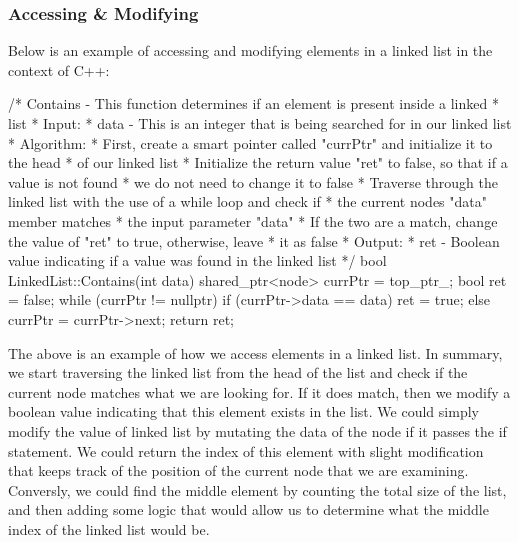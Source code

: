 \begin{highlight}

\subsubsection*{Accessing \& Modifying}

Below is an example of accessing and modifying elements in a linked list in the context of C++:

\begin{code}
/*  Contains - This function determines if an element is present inside a linked
*   list
*   Input:
*     data - This is an integer that is being searched for in our linked list
*   Algorithm:
*     First, create a smart pointer called "currPtr" and initialize it to the head
*     of our linked list
*     Initialize the return value "ret" to false, so that if a value is not found 
*     we do not need to change it to false
*     Traverse through the linked list with the use of a while loop and check if 
*     the current nodes "data" member matches
*     the input parameter "data"
*       If the two are a match, change the value of "ret" to true, otherwise, leave 
*       it as false
*   Output:
*     ret - Boolean value indicating if a value was found in the linked list
*/
bool LinkedList::Contains(int data){
    shared_ptr<node> currPtr = top_ptr_;
    bool ret = false;
    while (currPtr != nullptr) {
        if (currPtr->data == data) {
            ret = true;
        }
        else {}
        currPtr = currPtr->next;
    }
    return ret;
}
\end{code}

The above is an example of how we access elements in a linked list. In summary, we start traversing the linked list from the head of the list and check if the current node matches what we are looking
for. If it does match, then we modify a boolean value indicating that this element exists in the list. We could simply modify the value of linked list by mutating the data of the node if it passes the
if statement. We could return the index of this element with slight modification that keeps track of the position of the current node that we are examining. Conversly, we could find the middle element
by counting the total size of the list, and then adding some logic that would allow us to determine what the middle index of the linked list would be.

\end{highlight}

